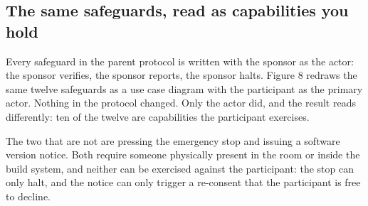 \subsection{The same safeguards, read as capabilities you hold}

Every safeguard in the parent protocol is written with the sponsor as the actor:
the sponsor verifies, the sponsor reports, the sponsor halts. Figure 8 redraws
the same twelve safeguards as a use case diagram with the participant as the
primary actor. Nothing in the protocol changed. Only the actor did, and the
result reads differently: ten of the twelve are capabilities the participant
exercises.

The two that are not are pressing the emergency stop and issuing a software
version notice. Both require someone physically present in the room or inside
the build system, and neither can be exercised against the participant: the stop
can only halt, and the notice can only trigger a re-consent that the participant
is free to decline.


